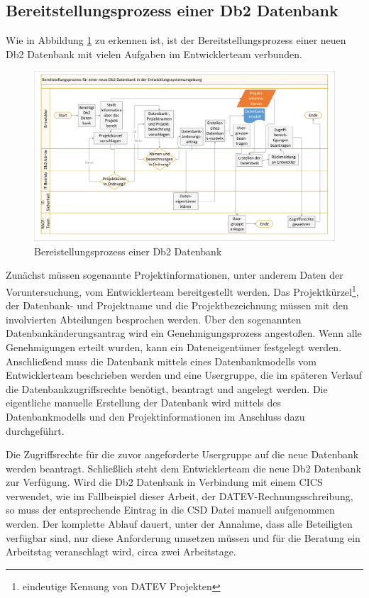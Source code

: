\subsection{Bereitstellungsprozess einer Db2 Datenbank}
Wie in Abbildung \ref{fig:aktdb2} zu erkennen ist, ist der Bereitstellungsprozess einer neuen Db2 Datenbank mit vielen Aufgaben im Entwicklerteam verbunden.
\begin{figure}[ht!]
\centering
\includegraphics[width=\paperwidth,angle=90]{figures/swimlaneDb2.pdf}
\caption{Bereistellungsprozess einer Db2 Datenbank}
\label{fig:aktdb2}
\end{figure}
Zunächst müssen sogenannte Projektinformationen, unter anderem Daten der Voruntersuchung, vom Entwicklerteam bereitgestellt werden.
Das Projektkürzel\footnote{eindeutige Kennung von DATEV Projekten}, der Datenbank- und Projektname und die Projektbezeichnung müssen mit den involvierten Abteilungen besprochen werden.
Über den sogenannten \glqq Datenbankänderungsantrag\grqq{} wird ein Genehmigungsprozess angestoßen.
Wenn alle Genehmigungen erteilt wurden, kann ein Dateneigentümer festgelegt werden.
Anschließend muss die Datenbank mittels eines Datenbankmodells vom Entwicklerteam beschrieben werden und eine Usergruppe, die im späteren Verlauf die Datenbankzugriffsrechte benötigt, beantragt und angelegt werden.
Die eigentliche manuelle Erstellung der Datenbank wird mittels des Datenbankmodells und den Projektinformationen im Anschluss dazu durchgeführt.

Die Zugriffsrechte für die zuvor angeforderte Usergruppe auf die neue Datenbank werden beantragt.
Schließlich steht dem Entwicklerteam die neue Db2 Datenbank zur Verfügung.
Wird die Db2 Datenbank in Verbindung mit einem CICS verwendet, wie im Fallbeispiel dieser Arbeit, der DATEV-Rechnungsschreibung, so muss der entsprechende Eintrag in die CSD Datei manuell aufgenommen werden. 
Der komplette Ablauf dauert, unter der Annahme, dass alle Beteiligten verfügbar sind, nur diese Anforderung umsetzen müssen und für die Beratung ein Arbeitstag veranschlagt wird, circa zwei Arbeitstage.

